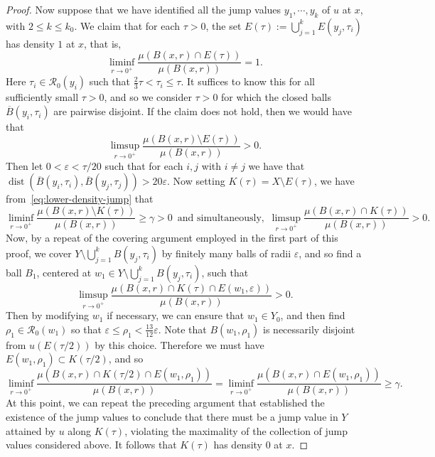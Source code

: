 \documentclass[11pt, letterpaper]{amsart} %
\newcommand*{\eps}{\varepsilon}
\DeclareMathOperator{\dist}{dist}
\numberwithin{equation}{section}
\theoremstyle{plain}
\theoremstyle{definition}
\begin{document}
{\begin{proof}
Now suppose that we have identified all the jump values $y_1,\cdots, y_k$ of $u$ at $x$, with $2\le k\le k_0$.
We claim that for each $\tau>0$, the set $E(\tau):=\bigcup_{j=1}^kE(y_j,\tau_i)$ has density $1$ at $x$, that is,
\[
\liminf_{r\to 0^+}\frac{\mu(B(x,r)\cap E(\tau))}{\mu(B(x,r))}=1.
\]
Here $\tau_i\in\mathcal{R}_0(y_i)$ such that $\tfrac23\tau<\tau_i\le \tau$.
It suffices to know this for all sufficiently small $\tau>0$, and so we consider $\tau>0$ for which
the closed balls $\overline{B}(y_i,\tau_i)$ are pairwise disjoint. 
If the claim does not hold, then we would have that
\[
\limsup_{r\to 0^+}\frac{\mu(B(x,r)\setminus E(\tau))}{\mu(B(x,r))}>0.
\]
Then let $0<\eps<\tau/20$ such that for each $i,j$ with $i\ne j$ we have that 
$\dist(\overline{B}(y_i,\tau_i), \overline{B}(y_j,\tau_j))>20\eps$.
Now setting $K(\tau)=X\setminus E(\tau)$, we have from~\eqref{eq:lower-density-jump} that 
\[
\liminf_{r\to 0^+}\frac{\mu(B(x,r)\setminus K(\tau))}{\mu(B(x,r))}\ge \gamma>0\, \text{ and simultaneously, }\, 
\limsup_{r\to 0^+}\frac{\mu(B(x,r)\cap K(\tau))}{\mu(B(x,r))}>0.
\]
Now, by a repeat of the covering argument employed in the first part of this proof,
we cover $Y\setminus \bigcup_{j=1}^k B(y_j,\tau_i)$ 
by finitely many balls of radii $\eps$, and so find a ball $B_1$, centered at 
$w_1\in Y\setminus \bigcup_{j=1}^k B(y_j,\tau_i)$, such that
\[
\limsup_{r\to 0^+}\frac{\mu(B(x,r)\cap K(\tau)\cap E(w_1,\eps))}{\mu(B(x,r))}>0.
\]
Then by modifying $w_1$ if necessary, we can ensure that $w_1\in Y_0$, and then find $\rho_1\in\mathcal{R}_0(w_1)$
so that $\eps\le \rho_1<\tfrac{13}{12}\eps$.  Note that 
$B(w_1,\rho_1)$ is necessarily disjoint from $u(E(\tau/2))$ by this choice.  Therefore we must have $E(w_1,\rho_1)\subset K(\tau/2)$, and so
\[
\liminf_{r\to 0^+}\frac{\mu(B(x,r)\cap K(\tau/2)\cap E(w_1,\rho_1))}{\mu(B(x,r))}
=\liminf_{r\to 0^+}\frac{\mu(B(x,r)\cap E(w_1,\rho_1))}{\mu(B(x,r))}\ge \gamma.
\]
At this point, we can repeat the preceding argument that established the existence of the jump values
to conclude that there must be a jump value in $Y$ attained by $u$ along $K(\tau)$, violating the maximality of the 
collection of jump values considered above. It follows that $K(\tau)$ has density $0$ at $x$.
\end{proof}


}
\end{document}
